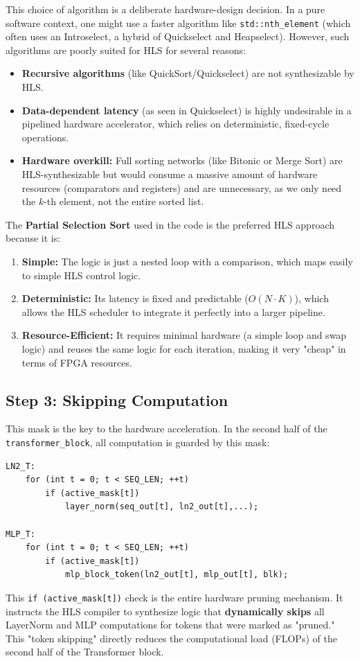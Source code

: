 This choice of algorithm is a deliberate hardware-design decision. In a pure software context, one might use a faster algorithm like \texttt{std::nth\_element} (which often uses an Introselect, a hybrid of Quickselect and Heapselect). However, such algorithms are poorly suited for HLS for several reasons:
\begin{itemize}
    \item \textbf{Recursive algorithms} (like QuickSort/Quickselect) are not synthesizable by HLS.
    \item \textbf{Data-dependent latency} (as seen in Quickselect) is highly undesirable in a pipelined hardware accelerator, which relies on deterministic, fixed-cycle operations.
    \item \textbf{Hardware overkill:} Full sorting networks (like Bitonic or Merge Sort) are HLS-synthesizable but would consume a massive amount of hardware resources (comparators and registers) and are unnecessary, as we only need the $k$-th element, not the entire sorted list.
\end{itemize}

The \textbf{Partial Selection Sort} used in the code is the preferred HLS approach because it is:
\begin{enumerate}
    \item \textbf{Simple:} The logic is just a nested loop with a comparison, which maps easily to simple HLS control logic.
    \item \textbf{Deterministic:} Its latency is fixed and predictable ($O(N \cdot K)$), which allows the HLS scheduler to integrate it perfectly into a larger pipeline.
    \item \textbf{Resource-Efficient:} It requires minimal hardware (a simple loop and swap logic) and reuses the same logic for each iteration, making it very "cheap" in terms of FPGA resources.
\end{enumerate}

\subsection{Step 3: Skipping Computation}
This mask is the key to the hardware acceleration. In the second half of the \texttt{transformer\_block}, all computation is guarded by this mask:
\begin{verbatim}
LN2_T:
    for (int t = 0; t < SEQ_LEN; ++t)
        if (active_mask[t])
            layer_norm(seq_out[t], ln2_out[t],...);

MLP_T:
    for (int t = 0; t < SEQ_LEN; ++t)
        if (active_mask[t])
            mlp_block_token(ln2_out[t], mlp_out[t], blk);
\end{verbatim}
This \texttt{if (active\_mask[t])} check is the entire hardware pruning mechanism. It instructs the HLS compiler to synthesize logic that \textbf{dynamically skips} all LayerNorm and MLP computations for tokens that were marked as "pruned." This "token skipping" \cite{ref10} directly reduces the computational load (FLOPs) of the second half of the Transformer block.

